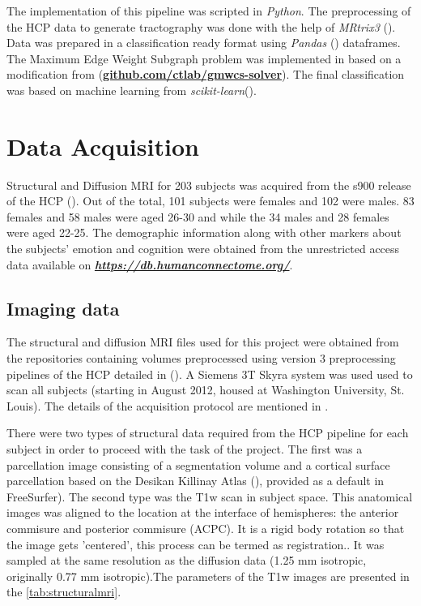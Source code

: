 \documentclass[msthesis.tex]{subfiles}
\begin{document}
The implementation of this pipeline was scripted in \textit{Python}. The preprocessing of the HCP data to generate tractography was done with the help of \textit{MRtrix3} (\cite{tournier2019mrtrix3}).  Data was prepared in a classification ready format using \textit{Pandas} (\cite{mckinney2011pandas}) dataframes. The Maximum Edge Weight Subgraph problem was implemented in  based on a modification from \cite{DBLP:journals/corr/LobodaAS16} (\href{https://github.com/ctlab/gmwcs-solver}{\textbf{github.com/ctlab/gmwcs-solver}}). The final classification was based on machine learning from \textit{scikit-learn}(\cite{sklearn_2012}). 

\section{Data Acquisition}
\label{sec:acquisition}
Structural and Diffusion MRI for 203 subjects was acquired from the s900 release of the HCP (\cite{hcp2015wu}). Out of the total, 101 subjects were females and 102 were males. 83 females and 58 males were aged 26-30 and while the 34 males and 28 females were aged 22-25. The demographic information along with other markers about the subjects' emotion and cognition were obtained from the unrestricted access data available on \href{https://db.humanconnectome.org/}{\textbf{\textit{https://db.humanconnectome.org/}}}.

\subsection{Imaging data}
The structural and diffusion MRI files used for this project were obtained from the repositories containing volumes preprocessed using version 3 preprocessing pipelines of the HCP detailed in (\cite{GLASSER2013105}). A Siemens 3T Skyra system was used used to scan all subjects (starting in August 2012, housed at Washington University, St. Louis). The details of the acquisition protocol are mentioned in \cite{van2012human}.


There were two types of structural data required from the HCP pipeline for each subject in order to proceed with the task of the project. The first was a parcellation image consisting of a segmentation volume and a cortical surface parcellation based on the Desikan Killinay Atlas (\cite{desikan2006automated}), provided as a default in FreeSurfer). The second type was the T1w scan in subject space. This anatomical images was aligned to the location at the interface of hemispheres: the anterior commisure and posterior commisure (ACPC). It is a rigid body rotation so that the image gets 'centered', this process can be termed as registration.. It was sampled at the same resolution as the diffusion data (1.25 mm isotropic, originally 0.77 mm isotropic).The parameters of the T1w images are presented in the \autoref{tab:structuralmri}.
\end{document}
